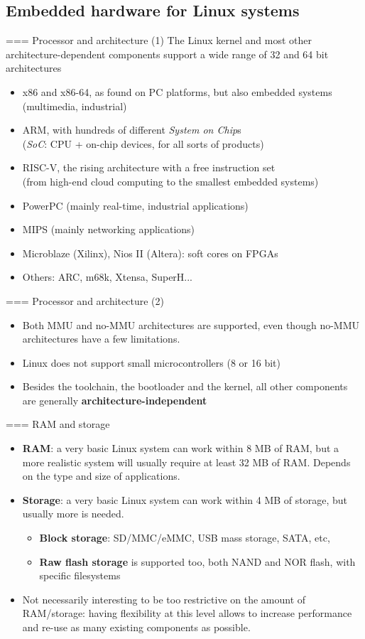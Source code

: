\subsection{Embedded hardware for Linux systems}

=== Processor and architecture (1)
  The Linux kernel and most other architecture-dependent
  components support a wide range of 32 and 64 bit architectures
  \begin{itemize}
  \item x86 and x86-64, as found on PC platforms, but also embedded systems
    (multimedia, industrial)
  \item ARM, with hundreds of different {\em System on Chip}s\\
        ({\em SoC}: CPU + on-chip devices, for all sorts of products)
  \item RISC-V, the rising architecture with a free instruction set\\
        (from high-end cloud computing to the smallest embedded systems)
  \item PowerPC (mainly real-time, industrial applications)
  \item MIPS (mainly networking applications)
  \item Microblaze (Xilinx), Nios II (Altera): soft cores on FPGAs
  \item Others: ARC, m68k, Xtensa, SuperH...
  \end{itemize}


=== Processor and architecture (2)
  \begin{itemize}
  \item Both MMU and no-MMU architectures are supported, even though
    no-MMU architectures have a few limitations.
  \item Linux does not support small microcontrollers (8 or 16 bit)
  \item Besides the toolchain, the bootloader and the kernel, all
    other components are generally {\bf architecture-independent}
  \end{itemize}


=== RAM and storage
  \begin{itemize}
  \item {\bf RAM}: a very basic Linux system can work within 8 MB of
    RAM, but a more realistic system will usually require at least 32
    MB of RAM. Depends on the type and size of applications.
  \item {\bf Storage}: a very basic Linux system can work within 4 MB
    of storage, but usually more is needed.
    \begin{itemize}
    \item {\bf Block storage}: SD/MMC/eMMC, USB mass storage, SATA, etc,
    \item {\bf Raw flash storage} is supported too, both NAND and NOR flash, with
      specific filesystems
    \end{itemize}
  \item Not necessarily interesting to be too restrictive on the
    amount of RAM/storage: having flexibility at this level allows to
    increase performance and re-use as many existing components as possible.
  \end{itemize}


